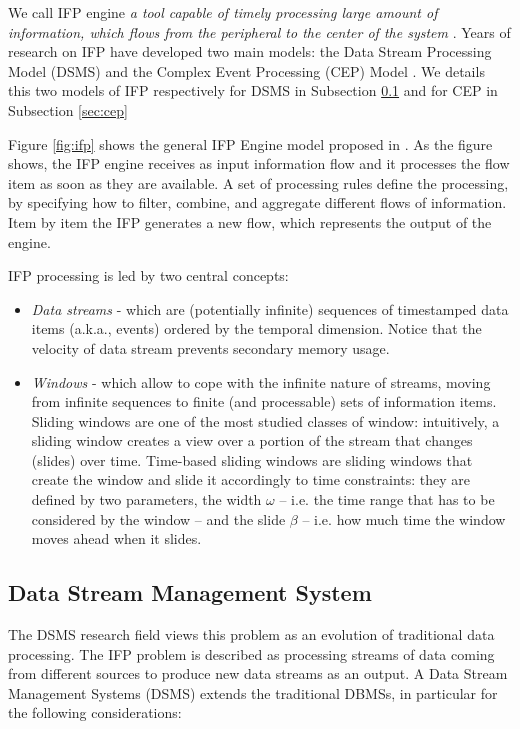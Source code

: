 We call IFP engine \textit{a tool capable of timely processing large amount of information, which flows from the peripheral to the center of the system} \cite{Cugola:2012:PFI:2187671.2187677}. Years of research on IFP have developed two main models: the Data Stream Processing Model (DSMS) \cite{Babcock:2002:MID:543613.543615} and the Complex Event Processing (CEP) Model \cite{Luckham:2001:PEI:515781}. We details this two models of IFP respectively for DSMS in Subsection \ref{sec:dsms} and for CEP in Subsection \ref{sec:cep}

Figure \ref{fig:ifp} shows the general IFP Engine model proposed in \cite{Cugola:2012:PFI:2187671.2187677}. As the figure shows, the IFP engine receives as input information flow and it processes the flow item as soon as they are available. A set of processing rules define the processing, by specifying how to filter, combine, and aggregate different flows of information. Item by item the IFP generates a new flow, which represents the output of the engine.

IFP processing is led by two central concepts:
\begin{itemize}

\item \textit{Data streams} - which are (potentially infinite) sequences of timestamped data items (a.k.a., events) ordered by the temporal dimension. Notice that the velocity of data stream prevents secondary memory usage. 

\item \textit{Windows} - which allow to cope with the infinite nature of streams, moving from infinite sequences to finite (and processable) sets of information items. Sliding windows are one of the most studied classes of window: intuitively, a sliding window creates a view over a portion of the stream that changes (slides) over time. Time-based sliding windows are sliding windows that create the window and slide it accordingly to time constraints: they are defined by two parameters, the width $\omega$	 – i.e. the time range that has to be considered by the window – and the slide $\beta$ – i.e. how much time the window moves ahead when it slides.

\end{itemize}

\subsection{Data Stream Management System}\label{sec:dsms}
The DSMS research field  views this problem as an evolution of traditional data processing. The IFP problem is described as processing streams of data coming from different sources to produce new data streams as an output. A Data Stream Management Systems (DSMS) extends the traditional DBMSs, in particular for the following considerations:


